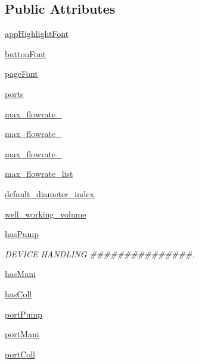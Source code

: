 \subsection*{Public Attributes}
\begin{DoxyCompactItemize}
\item 
\mbox{\hyperlink{classgui_1_1_app_aaa721570191997007c3664129d3cdeb1}{app\+Highlight\+Font}}
\item 
\mbox{\hyperlink{classgui_1_1_app_a6c43464b149411d3a1bd14477283d5f0}{button\+Font}}
\item 
\mbox{\hyperlink{classgui_1_1_app_a2f7deeba59223d06f410a49d002b2e54}{page\+Font}}
\item 
\mbox{\hyperlink{classgui_1_1_app_a03e97a8c57a5c6dc3636589851677877}{ports}}
\item 
\mbox{\hyperlink{classgui_1_1_app_a23a95b7d506c1970898541a1677d0e6c}{max\+\_\+flowrate\+\_}}
\item 
\mbox{\hyperlink{classgui_1_1_app_ac5ac6c62ac1e537fa2a7c94a4c1490ff}{max\+\_\+flowrate\+\_}}
\item 
\mbox{\hyperlink{classgui_1_1_app_a9fb295e66170c6310691740d3cb39a84}{max\+\_\+flowrate\+\_}}
\item 
\mbox{\hyperlink{classgui_1_1_app_a25bd43ab794259e4e88551867ceb4707}{max\+\_\+flowrate\+\_\+list}}
\item 
\mbox{\hyperlink{classgui_1_1_app_a1be7f18206cdfab2cf483a95b2955bb9}{default\+\_\+diameter\+\_\+index}}
\item 
\mbox{\hyperlink{classgui_1_1_app_a5a34334e0d696267cdfa62620d13f0e8}{well\+\_\+working\+\_\+volume}}
\item 
\mbox{\hyperlink{classgui_1_1_app_a278aeec151cbe5a16bd6aceaae66c78e}{has\+Pump}}
\begin{DoxyCompactList}\small\item\em D\+E\+V\+I\+CE H\+A\+N\+D\+L\+I\+NG \#\#\#\#\#\#\#\#\#\#\#\#\#\#\#. \end{DoxyCompactList}\item 
\mbox{\hyperlink{classgui_1_1_app_ada677a0578dcbe5eb5dba2e4010a8e96}{has\+Mani}}
\item 
\mbox{\hyperlink{classgui_1_1_app_a51601d0f252e6158b46510b3e08faeb1}{has\+Coll}}
\item 
\mbox{\hyperlink{classgui_1_1_app_a71142d3f164ba060bc8fd79085b41748}{port\+Pump}}
\item 
\mbox{\hyperlink{classgui_1_1_app_a0a0ff9ae77f8ab543ea53a1472726e0c}{port\+Mani}}
\item 
\mbox{\hyperlink{classgui_1_1_app_a3bf85840efd78e0e8ede4b11edecc0d6}{port\+Coll}}

\end{DoxyCompactItemize}
